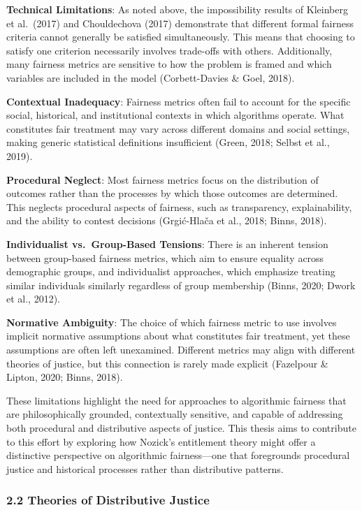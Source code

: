 \textbf{Technical Limitations}: As noted above, the impossibility
results of Kleinberg et al.~(2017) and Chouldechova (2017) demonstrate
that different formal fairness criteria cannot generally be satisfied
simultaneously. This means that choosing to satisfy one criterion
necessarily involves trade-offs with others. Additionally, many fairness
metrics are sensitive to how the problem is framed and which variables
are included in the model (Corbett-Davies \& Goel, 2018).

\textbf{Contextual Inadequacy}: Fairness metrics often fail to account
for the specific social, historical, and institutional contexts in which
algorithms operate. What constitutes fair treatment may vary across
different domains and social settings, making generic statistical
definitions insufficient (Green, 2018; Selbst et al., 2019).

\textbf{Procedural Neglect}: Most fairness metrics focus on the
distribution of outcomes rather than the processes by which those
outcomes are determined. This neglects procedural aspects of fairness,
such as transparency, explainability, and the ability to contest
decisions (Grgić-Hlača et al., 2018; Binns, 2018).

\textbf{Individualist vs.~Group-Based Tensions}: There is an inherent
tension between group-based fairness metrics, which aim to ensure
equality across demographic groups, and individualist approaches, which
emphasize treating similar individuals similarly regardless of group
membership (Binns, 2020; Dwork et al., 2012).

\textbf{Normative Ambiguity}: The choice of which fairness metric to use
involves implicit normative assumptions about what constitutes fair
treatment, yet these assumptions are often left unexamined. Different
metrics may align with different theories of justice, but this
connection is rarely made explicit (Fazelpour \& Lipton, 2020; Binns,
2018).

These limitations highlight the need for approaches to algorithmic
fairness that are philosophically grounded, contextually sensitive, and
capable of addressing both procedural and distributive aspects of
justice. This thesis aims to contribute to this effort by exploring how
Nozick's entitlement theory might offer a distinctive perspective on
algorithmic fairness---one that foregrounds procedural justice and
historical processes rather than distributive patterns.

\subsubsection{2.2 Theories of Distributive
Justice}\label{theories-of-distributive-justice}

